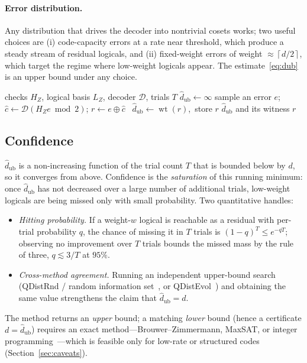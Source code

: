\documentclass[11pt]{article}
\DeclareMathOperator{\wt}{wt}
\newcommand{\HZ}{H_Z}
\newcommand{\dub}{\hat d_{\mathrm{ub}}}
\newcommand{\ceil}[1]{\left\lceil #1 \right\rceil}
\begin{document}
\paragraph{Error distribution.} Any distribution that drives the decoder into
nontrivial cosets works; two useful choices are (i) code-capacity errors at a rate
near threshold, which produce a steady stream of residual logicals, and (ii)
fixed-weight errors of weight $\approx\ceil{d/2}$, which target the regime where
low-weight logicals appear. The estimate~\eqref{eq:dub} is an upper bound under
any choice.

\begin{algorithm}[t]
\caption{Syndrome-decoder distance upper bound}
\label{alg:syndrome}
\begin{algorithmic}[1]
\Require checks $\HZ$, logical basis $L_Z$, decoder $\mathcal D$, trials $T$
\State $\dub\gets \infty$
  \State sample an error $e$;\quad $\hat c\gets\mathcal D(\HZ e\bmod 2)$;\quad
         $r\gets e\oplus\hat c$
  \If{$L_Z r\neq0\pmod2$ \textbf{and} $\wt(r)<\dub$} \ $\dub\gets\wt(r)$,\ store $r$
  \EndIf
\EndFor
\State \Return $\dub$ and its witness $r$ \Comment{$d\le\dub$, re-checkable}
\end{algorithmic}
\end{algorithm}

\subsection{Confidence}
\label{sec:syndrome-conf}
$\dub$ is a non-increasing function of the trial count $T$ that is bounded below
by $d$, so it converges from above. Confidence is the \emph{saturation} of this
running minimum: once $\dub$ has not decreased over a large number of additional
trials, low-weight logicals are being missed only with small probability. Two
quantitative handles:
\begin{itemize}
\item \emph{Hitting probability.} If a weight-$w$ logical is reachable as a
residual with per-trial probability $q$, the chance of missing it in $T$ trials is
$(1-q)^T\le e^{-qT}$; observing no improvement over $T$ trials bounds the missed
mass by the rule of three, $q\lesssim 3/T$ at $95\%$.
\item \emph{Cross-method agreement.} Running an independent upper-bound search
(QDistRnd / random information set~\cite{QDistRnd}, or QDistEvol~\cite{Survey})
and obtaining the same value strengthens the claim that $\dub=d$.
\end{itemize}
The method returns an \emph{upper} bound; a matching \emph{lower} bound (hence a
certificate $d=\dub$) requires an exact method---Brouwer--Zimmermann, MaxSAT, or
integer programming~\cite{Survey}---which is feasible only for low-rate or
structured codes (Section~\ref{sec:caveats}).
\end{document}
